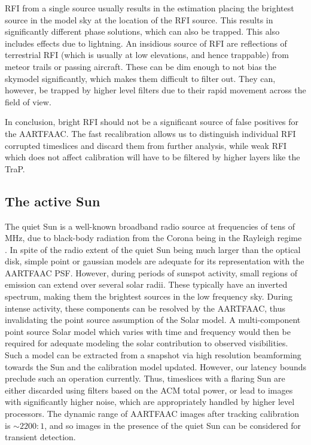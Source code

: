 \documentclass{aa}
\begin{document}
RFI from a single source usually results in the estimation placing the brightest
source in  the model sky  at the  location of the  RFI source.  This  results in
significantly different  phase solutions, which  can also be trapped.  This also
includes effects due  to lightning.  An insidious source  of RFI are reflections
of terrestrial  RFI (which  is usually at  low elevations, and  hence trappable)
from meteor trails or passing aircraft.  These can be dim enough to not bias the
skymodel significantly,  which makes  them difficult to  filter out.   They can,
however, be trapped  by higher level filters due to  their rapid movement across
the field of view.  

In conclusion, bright RFI should not  be a significant source of false positives
for  the  \mbox{AARTFAAC}.  The  fast  recalibration  allows  us to  distinguish
individual  RFI corrupted  timeslices and  discard them  from  further analysis,
while weak  RFI which does  not affect calibration  will have to be  filtered by
higher layers like the TraP.

\subsection{The active Sun}

The quiet Sun  is a well-known broadband radio source at  frequencies of tens of
MHz, due to black-body radiation from  the Corona being in the Rayleigh regime .
In spite of the radio extent of the quiet Sun being much larger than the optical
disk, simple point  or gaussian models are adequate  for its representation with
the  \mbox{AARTFAAC} PSF.  However,  during periods  of sunspot  activity, small
regions of emission can extend over several solar radii. These typically have an
inverted spectrum, making  them the brightest sources in  the low frequency sky.
During   intense   activity,  these   components   can   be   resolved  by   the
\mbox{AARTFAAC},  thus invalidating  the point  source assumption  of  the Solar
model. A  multi-component point  source Solar model  which varies with  time and
frequency would then be required for adequate modeling the solar contribution to
observed visibilities.  Such  a model can be extracted from  a snapshot via high
resolution  beamforming  towards the  Sun  and  the  calibration model  updated.
However,  our  latency  bounds  preclude  such an  operation  currently.   Thus,
timeslices with  a flaring Sun are  either discarded using filters  based on the
ACM total  power, or lead to  images with significantly higher  noise, which are
appropriately  handled  by  higher  level  processors.   The  dynamic  range  of
\mbox{AARTFAAC} images after tracking calibration is $\sim2200:1$, and so images
in the presence of the quiet Sun can be considered for transient detection.
\end{document}
